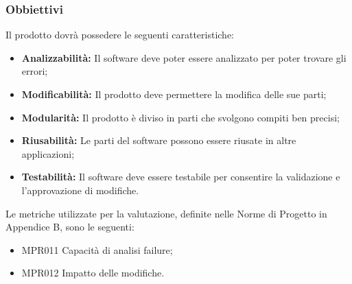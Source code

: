 \subsubsection{Obbiettivi } Il prodotto dovrà possedere le seguenti caratteristiche:
\begin{itemize}
	\item \textbf{Analizzabilità:} Il software deve poter essere analizzato per poter trovare gli errori;
	\item \textbf{Modificabilità:} Il prodotto deve permettere la modifica delle sue parti;
	\item \textbf{Modularità:} Il prodotto è diviso in parti che svolgono compiti ben precisi;
	\item \textbf{Riusabilità:} Le parti del software possono essere riusate in altre applicazioni;
	\item \textbf{Testabilità:} Il software deve essere testabile per consentire la validazione e l'approvazione di modifiche.
\end{itemize}	Le metriche utilizzate per la valutazione, definite nelle Norme di Progetto in Appendice B, sono le seguenti:
\begin{itemize}
	\item MPR011 Capacità di analisi failure;
	\item MPR012 Impatto delle modifiche.
\end{itemize}
\newpage
